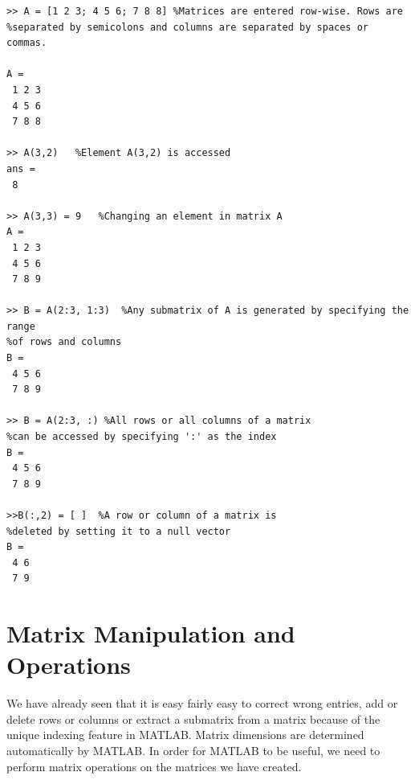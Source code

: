 \documentclass[paper=a4, fontsize=11pt]{scrartcl} %
\numberwithin{equation}{section} %
\numberwithin{figure}{section} %
\numberwithin{table}{section} %
\begin{document}
\begin{verbatim}
>> A = [1 2 3; 4 5 6; 7 8 8] %Matrices are entered row-wise. Rows are 
%separated by semicolons and columns are separated by spaces or commas.

A =
 1 2 3
 4 5 6
 7 8 8

>> A(3,2)	%Element A(3,2) is accessed
ans =
 8
 
>> A(3,3) = 9	%Changing an element in matrix A
A =
 1 2 3
 4 5 6
 7 8 9
 
>> B = A(2:3, 1:3)	%Any submatrix of A is generated by specifying the range 
%of rows and columns
B = 
 4 5 6
 7 8 9
 
>> B = A(2:3, :) %All rows or all columns of a matrix
%can be accessed by specifying ':' as the index 
B = 
 4 5 6
 7 8 9
 
>>B(:,2) = [ ]	%A row or column of a matrix is 
%deleted by setting it to a null vector
B = 
 4 6
 7 9

\end{verbatim}

\section{Matrix Manipulation and Operations}

We have already seen that it is easy fairly easy to correct wrong entries, add or delete rows or
columns or extract a submatrix from a matrix because of the unique indexing feature in MATLAB.
Matrix dimensions are determined automatically by MATLAB.
In order for MATLAB to be useful, we need to perform matrix operations on the matrices we have created.
\end{document}
